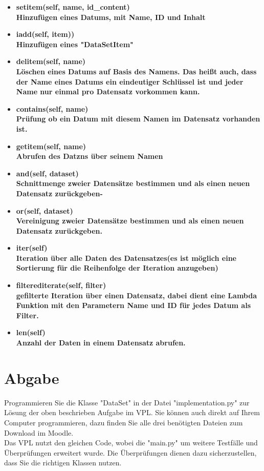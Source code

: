 \documentclass[titlepage]{article}
\begin{document}
    \begin{itemize}
        \item \bf setitem(self, name, id\_content)\normalfont\\
  Hinzufügen eines Datums, mit Name, ID und Inhalt
  \item \bf iadd(self, item))\normalfont\\
  Hinzufügen eines "DataSetItem"
  \item \bf delitem(self, name)\normalfont\\
  Löschen eines Datums auf Basis des Namens. Das heißt auch, dass der Name eines Datums ein eindeutiger Schlüssel ist und jeder Name nur einmal pro Datensatz vorkommen kann.
  \item \bf contains(self, name) \normalfont\\
  Prüfung ob ein Datum mit diesem Namen im Datensatz vorhanden ist.
  \item \bf getitem(self, name)\normalfont\\
  Abrufen des Datzns über seinem Namen 
  \item \bf and(self, dataset)\normalfont\\
  Schnittmenge zweier Datensätze bestimmen und als einen neuen Datensatz zurückgeben-
  \item \bf or(self, dataset)\normalfont\\
  Vereinigung zweier Datensätze bestimmen und als einen neuen Datensatz zurückgeben.
  \item \bf iter(self)\normalfont\\
  Iteration über alle Daten des Datensatzes(es ist möglich eine Sortierung für die Reihenfolge der Iteration anzugeben)
  \item \bf filterediterate(self, filter)\normalfont\\
  gefilterte Iteration über einen Datensatz, dabei dient eine Lambda Funktion mit den Parametern Name und ID für jedes Datum als Filter.
  \item \bf len(self)\normalfont\\
  Anzahl der Daten in einem Datensatz abrufen.\\
    \end{itemize}
  


\section{Abgabe}
\raggedright
Programmieren Sie die Klasse "DataSet" in der Datei "implementation.py" zur Lösung der oben beschrieben Aufgabe im VPL.
Sie können auch direkt auf Ihrem Computer programmieren, dazu finden Sie alle drei benötigten Dateien zum Download im Moodle.\\

Das VPL nutzt den gleichen Code, wobei die "main.py" um weitere Testfälle und Überprüfungen erweitert wurde.
Die Überprüfungen dienen dazu sicherzustellen, dass Sie die richtigen Klassen nutzen.\\
\end{document}
